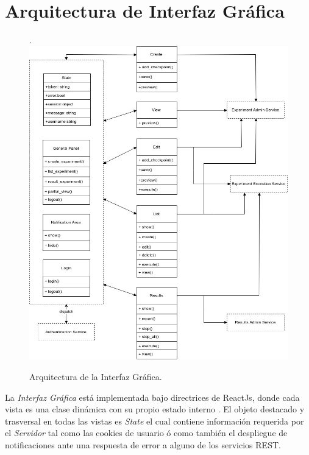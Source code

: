 \section{Arquitectura de Interfaz Gr\'afica}
\begin{figure}[!htb].
    \includegraphics[scale=0.42]{../figures/d21.jpg}
    \caption{Arquitectura de la Interfaz Gr\'afica. }
    \label{fig:d21}
\end{figure}

La \textit{Interfaz Gr\'afica} est\'a implementada bajo directrices de ReactJs\cite{react_thinking}, donde
cada vista es una clase din\'amica con su propio estado interno\cite{react_components} . El objeto destacado y trasversal
en todas las vistas es \textit{State}\cite{react_state} el cual contiene informaci\'on requerida por el 
\textit{Servidor} tal como las cookies de usuario \'o como tambi\'en el despliegue de notificaciones ante 
una respuesta de error a alguno de los servicios REST.   


\newpage